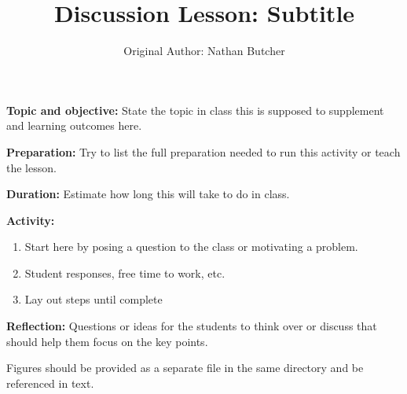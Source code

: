 \documentclass{article}
\title{Discussion Lesson: Subtitle}
\author{Original Author: Nathan Butcher}
\date{}
\begin{document}
\maketitle

\textbf{Topic and objective:} State the topic in class this is supposed to supplement and learning outcomes here. 

\textbf{Preparation:} Try to list the full preparation needed to run this activity or teach the lesson.

\textbf{Duration:} Estimate how long this will take to do in class. 

\hspace{14pt}

\textbf{Activity:}
\begin{enumerate}
\item Start here by posing a question to the class or motivating a problem.
\item Student responses, free time to work, etc.
\item Lay out steps until complete
\end{enumerate}

\textbf{Reflection:} Questions or ideas for the students to think over or discuss that should help them focus on the key points.

\hspace{14pt}

Figures should be provided as a separate file in the same directory and be referenced in text.
\end{document}
